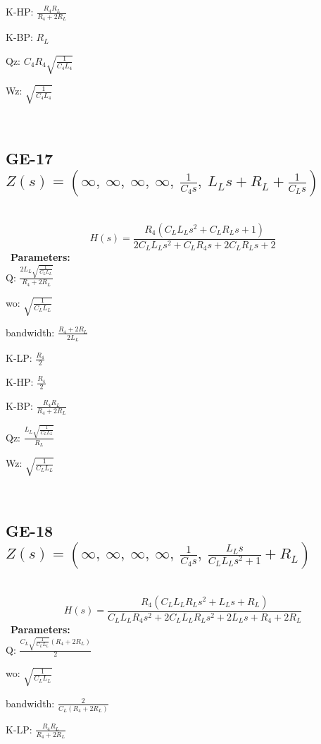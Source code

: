 \documentclass{article}
\begin{document}
K-HP: $\frac{R_{4} R_{L}}{R_{4} + 2 R_{L}}$\ 

K-BP: $R_{L}$\ 

Qz: $C_{4} R_{4} \sqrt{\frac{1}{C_{4} L_{4}}}$\ 

Wz: $\sqrt{\frac{1}{C_{4} L_{4}}}$\ 

\ 

\subsection{GE-17 $Z(s) = \left( \infty, \  \infty, \  \infty, \  \infty, \  \frac{1}{C_{4} s}, \  L_{L} s + R_{L} + \frac{1}{C_{L} s}\right)$ } \ 
\textbf{\[H(s) = \frac{R_{4} \left(C_{L} L_{L} s^{2} + C_{L} R_{L} s + 1\right)}{2 C_{L} L_{L} s^{2} + C_{L} R_{4} s + 2 C_{L} R_{L} s + 2}\] } \ 
\textbf{Parameters:}\\ 

Q: $\frac{2 L_{L} \sqrt{\frac{1}{C_{L} L_{L}}}}{R_{4} + 2 R_{L}}$\ 

wo: $\sqrt{\frac{1}{C_{L} L_{L}}}$\ 

bandwidth: $\frac{R_{4} + 2 R_{L}}{2 L_{L}}$\ 

K-LP: $\frac{R_{4}}{2}$\ 

K-HP: $\frac{R_{4}}{2}$\ 

K-BP: $\frac{R_{4} R_{L}}{R_{4} + 2 R_{L}}$\ 

Qz: $\frac{L_{L} \sqrt{\frac{1}{C_{L} L_{L}}}}{R_{L}}$\ 

Wz: $\sqrt{\frac{1}{C_{L} L_{L}}}$\ 

\ 

\subsection{GE-18 $Z(s) = \left( \infty, \  \infty, \  \infty, \  \infty, \  \frac{1}{C_{4} s}, \  \frac{L_{L} s}{C_{L} L_{L} s^{2} + 1} + R_{L}\right)$ } \ 
\textbf{\[H(s) = \frac{R_{4} \left(C_{L} L_{L} R_{L} s^{2} + L_{L} s + R_{L}\right)}{C_{L} L_{L} R_{4} s^{2} + 2 C_{L} L_{L} R_{L} s^{2} + 2 L_{L} s + R_{4} + 2 R_{L}}\] } \ 
\textbf{Parameters:}\\ 

Q: $\frac{C_{L} \sqrt{\frac{1}{C_{L} L_{L}}} \left(R_{4} + 2 R_{L}\right)}{2}$\ 

wo: $\sqrt{\frac{1}{C_{L} L_{L}}}$\ 

bandwidth: $\frac{2}{C_{L} \left(R_{4} + 2 R_{L}\right)}$\ 

K-LP: $\frac{R_{4} R_{L}}{R_{4} + 2 R_{L}}$\ 
\end{document}
